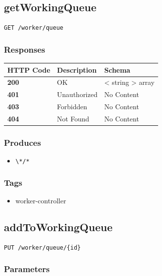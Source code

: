 \subsection{getWorkingQueue}\label{getworkingqueue}

\begin{verbatim}
GET /worker/queue
\end{verbatim}

\subsubsection{Responses}\label{responses-23}

\begin{longtable}[]{@{}lll@{}}
\toprule
HTTP Code & Description & Schema\tabularnewline
\midrule
\endhead
\textbf{200} & OK & \textless{} string \textgreater{}
array\tabularnewline
\textbf{401} & Unauthorized & No Content\tabularnewline
\textbf{403} & Forbidden & No Content\tabularnewline
\textbf{404} & Not Found & No Content\tabularnewline
\bottomrule
\end{longtable}

\subsubsection{Produces}\label{produces-23}

\begin{itemize}
\tightlist
\item
  \texttt{\textbackslash{}*/*}
\end{itemize}

\subsubsection{Tags}\label{tags-23}

\begin{itemize}
\tightlist
\item
  worker-controller
\end{itemize}

\subsection{addToWorkingQueue}\label{addtoworkingqueue}

\begin{verbatim}
PUT /worker/queue/{id}
\end{verbatim}

\subsubsection{Parameters}\label{parameters-19}

